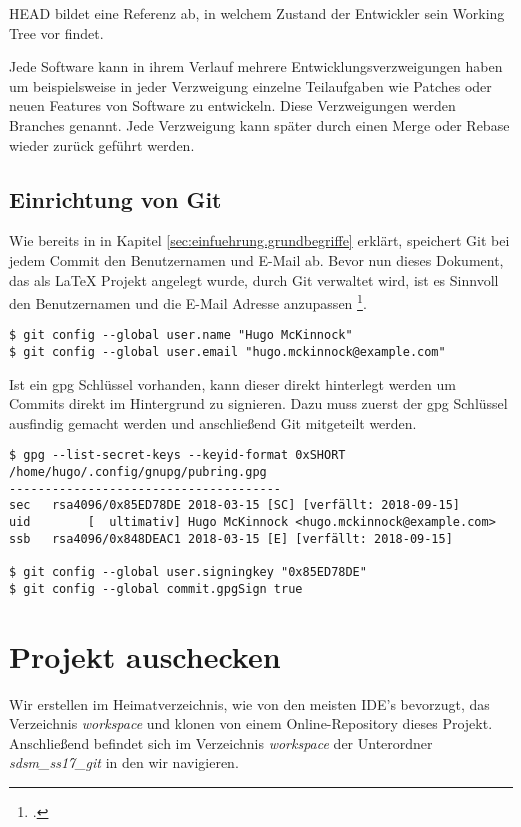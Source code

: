 HEAD bildet eine Referenz ab, in welchem Zustand der Entwickler sein Working Tree vor findet. 

Jede Software kann in ihrem Verlauf mehrere Entwicklungsverzweigungen haben um beispielsweise in jeder Verzweigung einzelne Teilaufgaben wie Patches oder neuen Features von Software zu entwickeln. Diese Verzweigungen werden Branches genannt. Jede Verzweigung kann später durch einen Merge oder Rebase wieder zurück geführt werden.


\label{sec:einfuehrung.git}
\subsection{Einrichtung von Git}
Wie bereits in in Kapitel \ref{sec:einfuehrung.grundbegriffe} erklärt, speichert Git bei jedem Commit den Benutzernamen und E-Mail ab. Bevor nun dieses Dokument, das als \LaTeX{} Projekt angelegt wurde, durch Git verwaltet wird, ist es Sinnvoll den Benutzernamen und die E-Mail Adresse anzupassen \footcite{git-1.6-your-identity}.

\begin{verbatim}
$ git config --global user.name "Hugo McKinnock"
$ git config --global user.email "hugo.mckinnock@example.com"
\end{verbatim}

Ist ein gpg Schlüssel vorhanden, kann dieser direkt hinterlegt werden um Commits direkt im Hintergrund zu signieren. Dazu muss zuerst der gpg Schlüssel ausfindig gemacht werden und anschließend Git mitgeteilt werden.

\begin{verbatim}
$ gpg --list-secret-keys --keyid-format 0xSHORT
/home/hugo/.config/gnupg/pubring.gpg
--------------------------------------
sec   rsa4096/0x85ED78DE 2018-03-15 [SC] [verfällt: 2018-09-15]
uid        [  ultimativ] Hugo McKinnock <hugo.mckinnock@example.com>
ssb   rsa4096/0x848DEAC1 2018-03-15 [E] [verfällt: 2018-09-15]

$ git config --global user.signingkey "0x85ED78DE"
$ git config --global commit.gpgSign true
\end{verbatim}

\section{Projekt auschecken}
Wir erstellen im Heimatverzeichnis, wie von den meisten IDE's bevorzugt, das Verzeichnis \textit{workspace} und klonen von einem Online-Repository dieses Projekt. Anschließend befindet sich im Verzeichnis \textit{workspace} der Unterordner \textit{sdsm\_ss17\_git} in den wir navigieren. 


